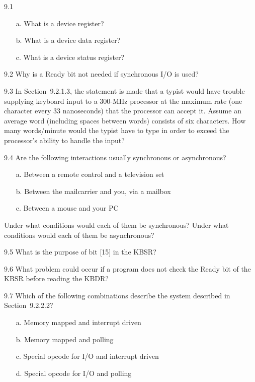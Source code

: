 \documentclass{patt}
\begin{document}
\begin{exercises}

\item[9.1]
\begin{enumerate}[a.]
\item[a.] What is a device register?
\item[b.] What is a device data register?
\item[c.] What is a device status register?
\end{enumerate}

\item[9.2] Why is a Ready bit not needed if synchronous I/O is used?

\item[9.3] In Section~9.2.1.3, the statement is made that a typist would
  have trouble supplying keyboard input to a 300-MHz processor at the
  maximum rate (one character every 33 nanoseconds) that the processor
  can accept it.  Assume an average word (including spaces between
  words) consists of six characters. How many words/minute would the
  typist have to type in order to exceed the processor's ability to
  handle the input?

\item[9.4] Are the following interactions usually synchronous or
  asynchronous?

\begin{enumerate}[a.]
\item[a.] Between a remote control and a television set
\item[b.] Between the mailcarrier and you, via a mailbox
\item[c.] Between a mouse and your PC
\end{enumerate}

Under what conditions would each of them be synchronous?  Under what
conditions would each of them be asynchronous?

\item[9.5] What is the purpose of bit [15] in the KBSR?

\item[9.6] What problem could occur if a program does not check the
  Ready bit of the KBSR before reading the KBDR?

\item[9.7] Which of the following combinations describe the system
  described in Section~9.2.2.2?

\begin{enumerate}[a.]
\item[a.] Memory mapped and interrupt driven
\item[b.] Memory mapped and polling
\item[c.] Special opcode for I/O and interrupt driven
\item[d.] Special opcode for I/O and polling
\end{enumerate}


\end{exercises}
\end{document}

